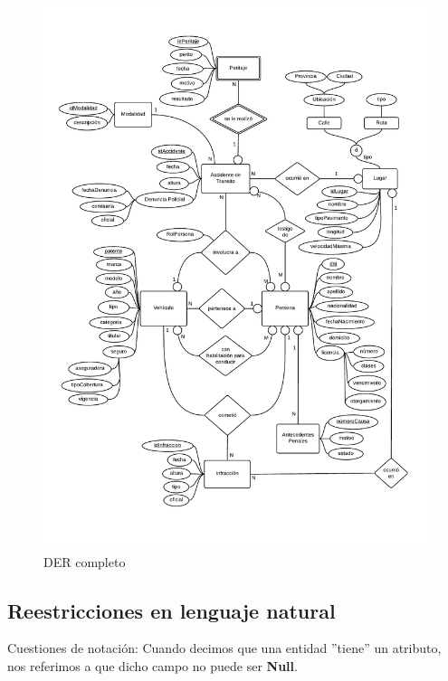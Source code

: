 \newpage
\begin{figure}
  \begin{center}
    \includegraphics[scale=0.6]{diagramas/3.pdf}
    \caption{DER completo}
  \end{center}
\end{figure}


\newpage
\subsection{Reestricciones en lenguaje natural}

Cuestiones de notación: Cuando decimos que una entidad ''tiene'' un atributo, nos referimos a que dicho campo no puede ser \textbf{Null}.


